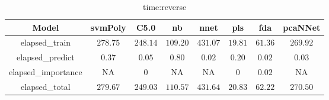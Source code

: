 \begin{table}[!ht]
	\centering
	\begin{tabular}{|c|c|c|c|c|c|c|c|}
		\hline
		Model & svmPoly & C5.0 & nb & nnet & pls & fda & pcaNNet \\ \hline
		elapsed_train & $278.75$ & $248.14$ & $109.20$ & $431.07$ & $19.81$ & $61.36$ & $269.92$ \\ \hline
		elapsed_predict & $0.37$ & $0.05$ & $0.80$ & $0.02$ & $0.20$ & $0.02$ & $0.03$ \\ \hline
		elapsed_importance & NA & $0$ & NA & NA & $0$ & $0.02$ & NA \\ \hline
		elapsed_total & $279.67$ & $249.03$ & $110.57$ & $431.64$ & $20.83$ & $62.22$ & $270.50$ \\ \hline
	\end{tabular}
	\caption{time:reverse}
	\label{tab:time:reverse}
\end{table}
